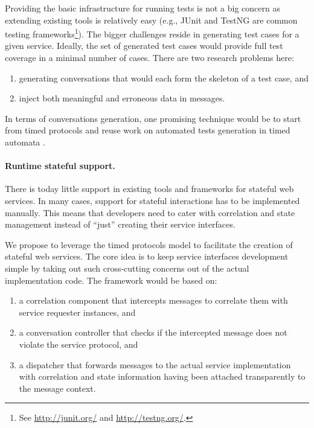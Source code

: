 Providing the basic infrastructure for running tests is not a big concern as extending existing tools is relatively easy (e.g., JUnit and TestNG are common testing frameworks\footnote{See \url{http://junit.org/} and \url{http://testng.org/}.}). The bigger challenges reside in generating test cases for a given service. Ideally, the set of generated test cases would provide full test coverage in a minimal number of cases. There are two research problems here:
\begin{enumerate}
  
  \item generating conversations that would each form the skeleton of a test case, and
  
  \item inject both meaningful and erroneous data in messages.
  
\end{enumerate}
In terms of conversations generation, one promising technique would be to start from timed protocols and reuse work on automated tests generation in timed automata \cite{NielsenS03,NielsenS01}.

\paragraph{Runtime stateful support.}
There is today little support in existing tools and frameworks for stateful web services. In many cases, support for stateful interactions has to be implemented manually. This means that developers need to cater with correlation and state management instead of ``just'' creating their service interfaces.

We propose to leverage the timed protocols model to facilitate the creation of stateful web services. The core idea is to keep service interfaces development simple by taking out such cross-cutting concerns out of the actual implementation code. The framework would be based on:
\begin{enumerate}
  
  \item a correlation component that intercepts messages to correlate them with service requester instances, and
  
  \item a conversation controller that checks if the intercepted message does not violate the service protocol, and
  
  \item a dispatcher that forwards messages to the actual service implementation with correlation and state information having been attached transparently to the message context.
  
\end{enumerate}

